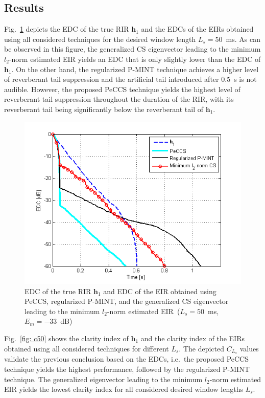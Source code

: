 \documentclass{article}
\begin{document}
\subsection{Results}
Fig.~\ref{fig: edc} depicts the EDC of the true RIR $\mathbf{h}_1$ and the EDCs of the EIRs obtained using all considered techniques for the desired window length $L_s = 50$~ms.
As can be observed in this figure, the generalized CS eigenvector leading to the minimum $l_2$-norm estimated EIR yields an EDC that is only slightly lower than the EDC of $\mathbf{h}_1$.
On the other hand, the regularized P-MINT technique achieves a higher level of reverberant tail suppression and the artificial tail introduced after $0.5$~s is not audible.
However, the proposed PeCCS technique yields the highest level of reverberant tail suppression throughout the duration of the RIR, with its reverberant tail being significantly below the reverberant tail of $\mathbf{h}_1$.
\begin{figure}[t!]
\centering
\includegraphics[scale=0.61]{Plots/EDC_5_-33}
\caption{EDC of the true RIR $\mathbf{h}_1$ and EDC of the EIR obtained using PeCCS, regularized P-MINT, and the generalized CS eigenvector leading to the minimum $l_2$-norm estimated EIR~($L_s = 50$~ms, $E_m = -33$~dB)}
\label{fig: edc}
\end{figure}
Fig.~\ref{fig: c50} shows the clarity index of $\mathbf{h}_1$ and the clarity index of the EIRs obtained using all considered techniques for different $L_s$.
The depicted $C_{L_s}$ values validate the previous conclusion based on the EDCs, i.e.~the proposed PeCCS technique yields the highest performance, followed by the regularized P-MINT technique.
The generalized eigenvector leading to the minimum $l_2$-norm estimated EIR yields the lowest clarity index for all considered desired window lengths $L_s$.
\end{document}
